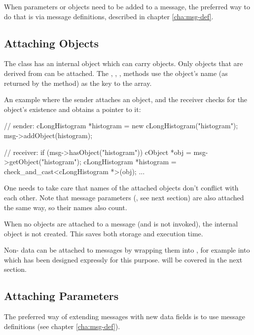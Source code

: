 When parameters or objects need to be added to a message, the preferred
way to do that is via message definitions, described in chapter
\ref{cha:msg-def}.


\subsection{Attaching Objects}
\label{sec:messages:attaching-objects}

The  class has an internal  object which
can carry objects. Only objects that are derived from  can
be attached. The , ,
,  methods use the object's name
(as returned by the  method) as the key to the array.

An example where the sender attaches an object, and the receiver
checks for the object's existence and obtains a pointer to it:

\begin{cpp}
// sender:
cLongHistogram *histogram = new cLongHistogram("histogram");
msg->addObject(histogram);

// receiver:
if (msg->hasObject("histogram")) {
   cObject *obj = msg->getObject("histogram");
   cLongHistogram *histogram = check_and_cast<cLongHistogram *>(obj);
   ...
}
\end{cpp}

One needs to take care that names of the attached objects don't
conflict with each other. Note that message parameters (,
see next section) are also attached the same way, so their names
also count.

When no objects are attached to a message (and  is not
invoked), the internal  object is not created.
This saves both storage and execution time.

Non- data can be attached to messages by wrapping them into
, for example into  which has been designed
expressly for this purpose.  will be covered in the next
section.

\subsection{Attaching Parameters}
\label{sec:messages:attaching-parameters}

The preferred way of extending messages with new data fields is to use
message definitions (see chapter \ref{cha:msg-def}).

